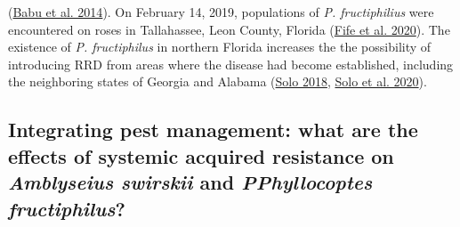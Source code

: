 \documentclass{ufdissertation}[overrideChapters] %
\begin{document}
{(\protect\hyperlink{ref-Babu2014}{Babu et al. 2014}). On February 14, 2019, populations of \emph{P. fructiphilius} were encountered on roses in Tallahassee, Leon County, Florida (\protect\hyperlink{ref-Fife2020}{Fife et al. 2020}). The existence of \emph{P. fructiphilus} in northern Florida increases the the possibility of introducing RRD from areas where the disease had become established, including the neighboring states of Georgia and Alabama (\protect\hyperlink{ref-Solo2018}{Solo 2018}, \protect\hyperlink{ref-Solo2020}{Solo et al. 2020}).

\hypertarget{integrating-pest-management-what-are-the-effects-of-systemic-acquired-resistance-on-amblyseius-swirskii-and-pphyllocoptes-fructiphilus}{%
\subsection{\texorpdfstring{Integrating pest management: what are the effects of systemic acquired resistance on \emph{Amblyseius swirskii} and \emph{PPhyllocoptes fructiphilus}?}{Integrating pest management: what are the effects of systemic acquired resistance on Amblyseius swirskii and PPhyllocoptes fructiphilus?}}\label{integrating-pest-management-what-are-the-effects-of-systemic-acquired-resistance-on-amblyseius-swirskii-and-pphyllocoptes-fructiphilus}}

}
\end{document}

